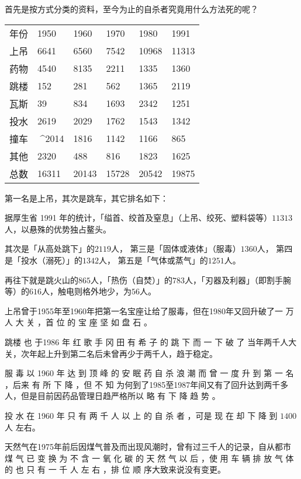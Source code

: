 \documentclass[UTF8]{ctexart}
\begin{document}
首先是按方式分类的资料，至今为止的自杀者究竟用什么方法死的呢？

\begin{table}[]
\center
\begin{tabular}{llllll}
年份 & 1950  & 1960  & 1970  & 1980  & 1991  \\
上吊 & 6641  & 6560  & 7542  & 10968 & 11313 \\
药物 & 4540  & 8135  & 2211  & 1335  & 1360  \\
跳楼 & 152   & 281   & 562   & 1365  & 2119  \\
瓦斯 & 39    & 834   & 1693  & 2342  & 1251  \\
投水 & 2619  & 2029  & 1762  & 1543  & 1342  \\
撞车 & ^^^^2014     & 1816  & 1142  & 1166  & 865   \\
其他 & 2320  & 488   & 816   & 1823  & 1625  \\
总数 & 16311 & 20143 & 15728 & 20542 & 19875
\end{tabular}
\end{table}

第一名是上吊，其次是跳车，其它排名如下：

据厚生省 1991 年的统计，「缢首、绞首及窒息」（上吊、绞死、塑料袋等）$11313$ 人，以悬殊的优势独占鳌头。

其次是「从高处跳下」的$2119$人，
第三是「固体或液体」（服毒）$1360$人，
第四是「投水（溺死）」的$1342$人，
第五是「气体或蒸气」的$1251$人。

再往下就是跳火山的$865$人，「热伤（自焚）」的$783$人，「刃器及利器」（即割手腕等）的$616$人，触电则格外地少，为$56$人。

上吊曾于1955年至1960年把第一名宝座让给了服毒，但在1980年又回升破了一 万 人 大 关 ，首 位 的 宝 座 坚 如 盘 石 。

跳楼 也 于1986 年 红 歌 手 冈 田 有 希 子 的 跳 下 而 一 下 破 了 当年两千人大关，次年起上升到第二名后未曾再少于两千人，趋于稳定。

服 毒 以 1960 年 达 到 顶 峰 的 安 眠 药 自 杀 浪 潮 而 曾 一 度 升 到 第 一 名 ，后来 有 所 下 降 ，但 不 知 为何到了1985至1987年间又有了回升达到两千多人，但是目前因药品管理日趋严格所以 略 有 下 降 趋 势 。

投 水 在 1960 年 只 有 两 千 人 以 上 的 自 杀 者 ，可是 现 在 却 下 降 到 $1400$ 人 左右。

天然气在1975年前后因煤气普及而出现风潮时，曾有过三千人的记录，自从都市 煤 气 已 变 换 为 不 含 一 氧 化 碳 的 天 然 气 以 后 ，使 用 车 辆 排 放 气 体 的 也 只 有 一 千 人 左 右 ，排 位 顺 序大致来说没有变更。
\end{document}
